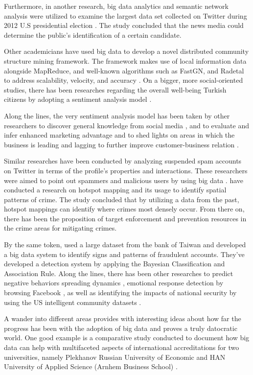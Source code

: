 Furthermore, in another research, big data analytics and semantic network analysis were utilized to examine the largest data set collected on Twitter during 2012 U.S presidential election \cite{Guo2015}. The study concluded that the news media could determine the public’s identification of a certain candidate.

Other academicians have used big data to develop a novel distributed community structure mining framework. The framework makes use of local information data alongside MapReduce, and well-known algorithms such as FastGN, and Radetal to address scalability, velocity, and accuracy \cite{Jin2015}. On a bigger, more social-oriented studies, there has been researches regarding the overall well-being Turkish citizens by adopting a sentiment analysis model \cite{Durahim2015}.

Along the lines, the very sentiment analysis model has been taken by other researchers to discover general knowledge from social media \cite{Bohlouli2015}, and to evaluate and infer enhanced marketing advantage and to shed lights on areas in which the business is leading and lagging to further improve customer-business relation \cite{He2015}.

Similar researches have been conducted by analyzing suspended spam accounts on Twitter in terms of the profile’s properties and interactions. These researchers were aimed to point out spammers and malicious users by using big data \cite{Almaatouq2016}. \citeauthor{Chainey2008} have conducted a research on hotspot mapping and its usage to identify spatial patterns of crime. The study concluded that by utilizing a data from the past, hotspot mappings can identify where crimes most densely occur. From there on, there has been the proposition of target enforcement and prevention resources in the crime areas for mitigating crimes.

By the same token, \cite{Li2012} used a large dataset from the bank of Taiwan and developed a big data system to identify signs and patterns of fraudulent accounts. They’ve developed a detection system by applying the Bayesian Classification and Association Rule. Along the lines, there has been other researches to predict negative behaviors spreading dynamics \cite{Liao2015}, emotional response detection by browsing Facebook \cite{Lin2015}, as well as identifying the impacts of national security by using the US intelligent community datasets \cite{Crampton2015}.

A wander into different areas provides with interesting ideas about how far the progress has been with the adoption of big data and proves a truly datocratic world. One good example is a comparative study conducted to document how big data can help with multifaceted aspects of international accreditations for two universities, namely Plekhanov Russian University of Economic and HAN University of Applied Science (Arnhem Business School) \cite{Popescu2019}.

